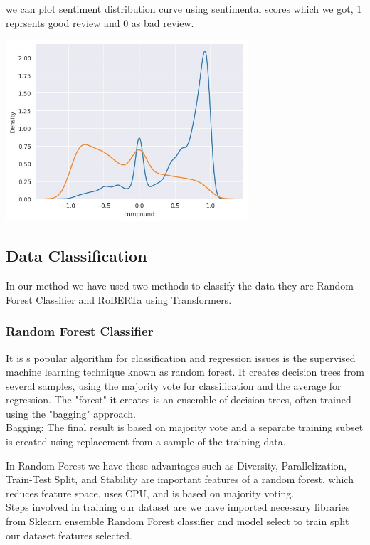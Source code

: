 we can plot sentiment distribution curve using sentimental scores which we got, 1 reprsents good review and 0 as bad review.

\includegraphics[width=9cm, height=6cm \textwidth]{density.jpeg}
\subsection{Data Classification}
In our method we have used two methods to classify the data they are  Random Forest Classifier and RoBERTa using Transformers.
\subsubsection{Random Forest Classifier}
It is s popular algorithm for classification and regression issues is the supervised machine learning technique known as random forest. It creates decision trees from several samples, using the majority vote for classification and the average for regression.
The "forest" it creates is an ensemble of decision trees, often trained using the "bagging" approach.\\

 Bagging: The final result is based on majority vote and a separate training subset is created using replacement from a sample of the training data. 

In Random Forest we have these advantages such as Diversity, Parallelization, Train-Test Split, and Stability are important features of a random forest, which reduces feature space, uses CPU, and is based on majority voting.\\

Steps involved in training our dataset are we have imported necessary libraries from Sklearn ensemble Random Forest classifier and model select to train split our dataset features selected.\\

